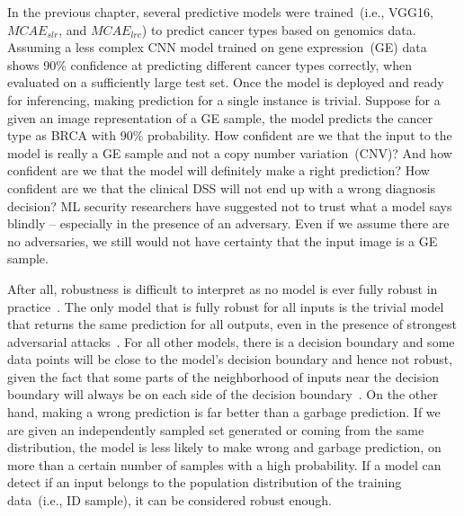 \hspace*{3.5mm} In the previous chapter, several predictive models were trained~(i.e., VGG16, $MCAE_{slr}$, and $MCAE_{lrc}$) to predict cancer types based on genomics data. Assuming a less complex CNN model trained on gene expression~(GE) data shows 90\% confidence at predicting different cancer types correctly, when evaluated on a sufficiently large test set. Once the model is deployed and ready for inferencing, making prediction for a single instance is trivial. Suppose for a given an image representation of a GE sample, the model predicts the cancer type as BRCA with 90\% probability. How confident are we that the input to the model is really a GE sample and not a copy number variation~(CNV)? And how confident are we that the model will definitely make a right prediction? How confident are we that the clinical DSS will not end up with a wrong diagnosis decision? ML security researchers have suggested not to trust what a model says blindly -- especially in the presence of an adversary. Even if we assume there are no adversaries, we still would not have certainty that the input image is a GE sample. 

\hspace*{3.5mm} After all, robustness is difficult to interpret as no model is ever fully robust in practice~\cite{RobustnessNotEnough}. The only model that is fully robust for all inputs is the trivial model that returns the same prediction for all outputs, even in the presence of strongest adversarial attacks~\cite{RobustnessNotEnough}. For all other models, there is a decision boundary and some data points will be close to the model’s decision boundary and hence not robust, given the fact that some parts of the neighborhood of inputs near the decision boundary will always be on each side of the decision boundary~\cite{RobustnessNotEnough}. On the other hand, making a wrong prediction is far better than a garbage prediction. If we are given an independently sampled set generated or coming from the same distribution, the model is less likely to make wrong and garbage prediction, on more than a certain number of samples with a high probability. If a model can detect if an input belongs to the population distribution of the training data~(i.e., ID sample), it can be considered robust enough. 

